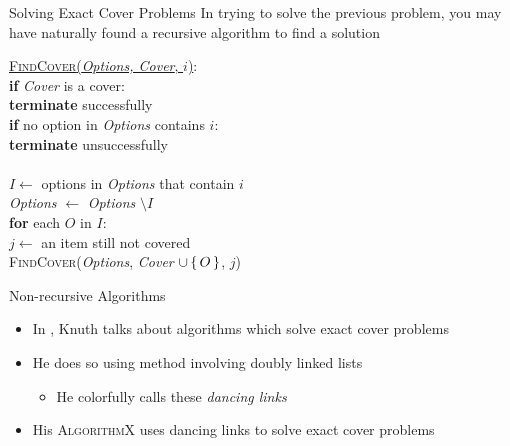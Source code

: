 \documentclass[aspectratio=169, handout]{beamer}
\begin{document}
\begin{frame}{Solving Exact Cover Problems}
    In trying to solve the previous problem, you may have naturally found a recursive algorithm to find a solution \pause
    \begin{nalgo}
    \underline{\textsc{FindCover}(\emph{Options, Cover}, $i$)}:
    \\\label{}  \textbf{if} \emph{Cover} is a cover:\+
    \\\label{}      \textbf{terminate} successfully\-
    \\\label{}  \textbf{if} no option in \emph{Options} contains $i$:\+
    \\\label{}      \textbf{terminate} unsuccessfully\-
    \\\label{}
    \\\label{}  $I \gets$ options in \emph{Options} that contain $i$
    \\\label{}  \emph{Options} $\gets$ \emph{Options} $\setminus I$
    \\\label{}  \textbf{for} each $O$ in $I$:\+
    \\\label{}      $j \gets$ an item still not covered
    \\\label{}      \textsc{FindCover}(\emph{Options}, \emph{Cover} $\cup \set{O}$, $j$)
    \end{nalgo}
\end{frame}

\begin{frame}{Non-recursive Algorithms}
    \begin{itemize}
        \item In \cite[Chapter~7.2.1.1]{TAOCP4B}, Knuth talks about algorithms which solve exact cover problems \pause
        \item He does so using method involving \textcolor{sigma@mainblue}{doubly linked lists}
        \begin{itemize}
            \item He colorfully calls these \emph{dancing links}
        \end{itemize} \pause
        \item His \textsc{AlgorithmX} uses dancing links to solve exact cover problems
    \end{itemize}
\end{frame}
\end{document}
